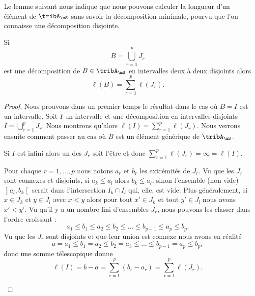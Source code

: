 Le lemme suivant nous indique que nous pouvons calculer la longueur d'un élément de \( \tribA_{\mS}\) sans savoir la décomposition minimale, pourvu que l'on connaisse une décomposition disjointe.
\begin{lemma}\label{LemIUQooEzHun}
	Si
	\begin{equation}
		B=\bigcup_{r=1}^pJ_r
	\end{equation}
	est une décomposition de \( B\in\tribA_{\mS}\) en intervalles deux à deux disjoints alors
	\begin{equation}
		\ell(B)=\sum_{r=1}^p\ell(J_r).
	\end{equation}
\end{lemma}

\begin{proof}
	Nous prouvons dans un premier temps le résultat dans le cas où \( B=I\) est un intervalle. Soit \( I\) un intervalle et une décomposition en intervalles disjoints \( I=\bigcup_{r=1}^pJ_r\). Nous montrons qu'alors \( \ell(I)=\sum_{r=1}^p\ell(J_r)\). Nous verrons ensuite comment passer au cas où \( B\) est un élément générique de \( \tribA_{\mS}\).
	\begin{subproof}
		\spitem[Si \( B=I\) est un intervalle infini]

		Si \( I\) est infini alors un des \( J_r\) soit l'être et donc \( \sum_{r=1}^p\ell(J_r)=\infty=\ell(I)\).
		\spitem[Si \( B=I\) est un intervalle ininfini]

		Pour chaque \( r=1,\ldots, p\) nous notons \( a_r\) et \( b_r\) les extrémités de \( J_r\). Vu que les \( J_r\) sont connexes et disjoints, si \( a_k\leq a_l\) alors \( b_k\leq a_l\), sinon l'ensemble (non vide) \( \mathopen] a_l , b_k \mathclose[ \) serait dans l'intersection \( I_k\cap I_l\) qui, elle, est vide. Plus généralement, si \( x\in J_k\) et \( y\in J_l\) avec \( x<y\) alors pour tout \( x'\in J_k\) et tout \( y'\in J_l\) nous avons \( x'<y'\). Vu qu'il y a un nombre fini d'ensembles \( J_r\), nous pouvons les classer dans l'ordre croissant :
		\begin{equation}
			a_1\leq b_1\leq a_2\leq b_2\leq \ldots\leq b_{p-1}\leq a_p\leq b_p.
		\end{equation}
		Vu que les \( J_r\) sont disjoints et que leur union est connexe nous avons en réalité
		\begin{equation}
			a=a_1\leq b_1=a_2\leq b_2=a_3\leq\ldots\leq b_{p-1}= a_p\leq b_p,
		\end{equation}
		donc une somme télescopique donne
		\begin{equation}
			\ell(I)=b-a=\sum_{r=1}^p(b_r-a_r)=\sum_{r=1}^p\ell(J_r).
		\end{equation}


\end{subproof}
\end{proof}
